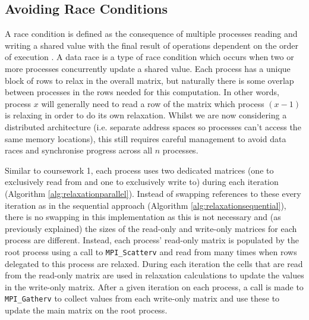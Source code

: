 \documentclass[11pt]{article}
\begin{document}
{\color{darkindigo}
\subsection*{Avoiding Race Conditions}}
A race condition is defined as the consequence of multiple processes reading and writing a shared value with the final result of operations dependent on the order of execution \cite{carr2002}. A data race is a type of race condition which occurs when two or more processes concurrently update a shared value. Each process has a unique block of rows to relax in the overall matrix, but naturally there is some overlap between processes in the rows needed for this computation. In other words, process $x$ will generally need to read a row of the matrix which process $(x-1)$ is relaxing in order to do its own relaxation. Whilst we are now considering a distributed architecture (i.e. separate address spaces so processes can't access the same memory locations), this still requires careful management to avoid data races and synchronise progress across all $n$ processes.

Similar to coursework 1, each process uses two dedicated matrices (one to exclusively read from and one to exclusively write to) during each iteration (Algorithm \ref{alg:relaxationparallel}). Instead of swapping references to these every iteration as in the sequential approach (Algorithm \ref{alg:relaxationsequential}), there is no swapping in this implementation as this is not necessary and (as previously explained) the sizes of the read-only and write-only matrices for each process are different. Instead, each process' read-only matrix is populated by the root process using a call to \texttt{MPI\_Scatterv} and read from many times when rows delegated to this process are relaxed. During each iteration the cells that are read from the read-only matrix are used in relaxation calculations to update the values in the write-only matrix. After a given iteration on each process, a call is made to \texttt{MPI\_Gatherv} to collect values from each write-only matrix and use these to update the main matrix on the root process. 
\end{document}
